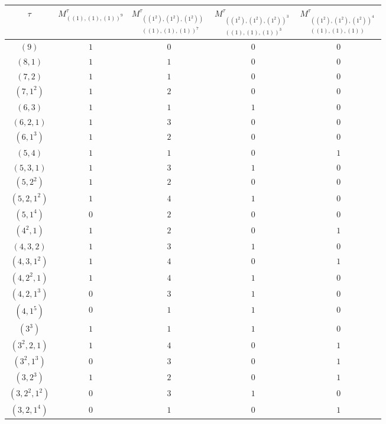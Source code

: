 \documentclass[11pt]{article}
\theoremstyle{definition}
\numberwithin{equation}{section}
\begin{document}
 
		\begin{figure} [H]
			\centering
			\begin{tabular}{|c|c|c|c|c|}
				\hline
				$\tau$ &$M_{((1),(1),(1))^9}^\tau$ 
				& $M_{\substack{((1^2),(1^2),(1^2))\\ ((1),(1),(1))^7}}^\tau$ 
				&$M_{\substack{((1^2),(1^2),(1^2))^3\\ ((1),(1),(1))^3}}^\tau$
				&$M_{\substack{((1^2),(1^2),(1^2))^4\\ ((1),(1),(1)) }}^\tau$\\ \hline
				$(9)$ & $1$ &$0$&$0$&$0$\\ \hline
				$(8,1)$ & $1$ &$1$&$0$&$0$\\ \hline
				$(7,2)$ & $1$ &$1$&$0$&$0$\\ \hline
				$(7,1^2)$ & $1$ &$2$&$0$&$0$\\ \hline
				$(6,3)$ & $1$ &$1$&$1$&$0$\\ \hline
				$(6,2,1)$ & $1$ &$3$&$0$&$0$\\ \hline
				$(6,1^3)$ & $1$ &$2$&$0$&$0$\\ \hline
					$(5,4)$ & $1$ &$1$&$0$&$1$\\ \hline
				$(5,3,1)$ & $1$ &$3$&$1$&$0$\\ \hline
				$(5,2^2)$ & $1$ &$2$&$0$&$0$\\ \hline
				$(5,2,1^2)$ & $1$ &$4$&$1$&$0$\\ \hline
					$(5,1^4)$ & $0$ &$2$&$0$&$0$\\ \hline
				$(4^2,1)$ & $1$ &$2$&$0$&$1$\\ \hline
				$(4,3,2)$ & $1$ &$3$&$1$&$0$\\ \hline
				$(4,3,1^2)$ & $1$ &$4$&$0$&$1$\\ \hline
				$(4,2^2,1)$ & $1$ &$4$&$1$&$0$\\ \hline
				$(4,2,1^3)$ & $0$ & $3$&$1$&$0$\\ \hline
					$(4,1^5)$ & $0$ &$1$&$1$&$0$\\ \hline
				$(3^3)$ & $1$ &$1$&$1$&$0$\\ \hline
				$(3^2,2,1)$ & $1$ &$4$&$0$&$1$\\ \hline
				$(3^2,1^3)$ & $0$ &$3$&$0$&$1$\\ \hline	
				$(3,2^3)$ & $1$ &$2$&$0$&$1$\\ \hline
				$(3,2^2,1^2)$ & $0$ &$3$&$1$  &$0$\\ \hline
					$(3,2,1^4)$ & $0$ &$1$&$0$&$1$\\ \hline
				\end{tabular}
\end{figure}
\end{document}
